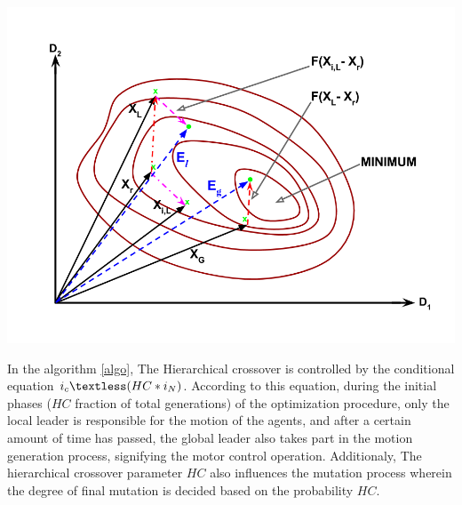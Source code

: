 \documentclass[conference]{IEEEtran}
\begin{document}
\includegraphics[scale=0.25]{contourDL}

In the algorithm \ref{algo}, The Hierarchical crossover is controlled by the conditional equation $i_c \textless (HC*i_N)$. According to this equation, during the initial phases ($HC$ fraction of total generations) of the optimization procedure, only the local leader is responsible for the motion of the agents, and after a certain amount of time has passed, the global leader also takes part in the motion generation process, signifying the motor control operation.
Additionaly, The hierarchical crossover parameter $HC$ also influences the mutation process wherein the degree of final mutation is decided based on the probability $HC$.


%
%
\end{document}
